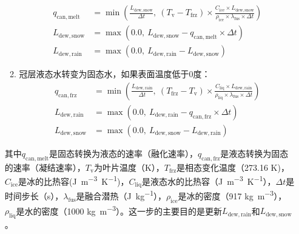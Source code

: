 \begin{enumerate}
\begin{enumerate}
\begin{equation}
\begin{aligned}
            q_{\mathrm{can, melt}} &=\min \left(\frac{L_{\mathrm{dew,snow}}}{\Delta t},\ \left(T_{\mathrm{v}}-T_{\mathrm{frz}}\right) \times \frac{C_{\mathrm{ice}} \times L_{\mathrm{dew,snow}}}{\rho_{\mathrm{i c e}} \times \lambda_{\mathrm{fus}} \times \Delta t}\right) \\
            L_{\mathrm{dew,snow}} &=\max \left(0.0,\ L_{\mathrm{dew,snow}}-q_{\mathrm{c a n, m e l t}} \times \Delta t\right) \\
            L_{\mathrm{dew,rain}} &=\max \left(0.0,\ L_{\mathrm{dew,rain}}-L_{\mathrm{dew,snow}}\right)
          \end{aligned}
        \end{equation}
      \item 冠层液态水转变为固态水，如果表面温度低于0度：
        \begin{equation}
          \begin{aligned}
            q_{\mathrm{c a n, f r z}} &=\min \left(\frac{L_{\mathrm{dew,rain}}}{\Delta t},\ \left(T_{\mathrm{f r z}}-T_{\mathrm{v}}\right) \times \frac{C_{\mathrm{liq}} \times L_{\mathrm{dew,rain}}}{\rho_{\mathrm{liq}} \times \lambda_{\mathrm{fus}} \times \Delta t}\right) \\
            L_{\mathrm{dew,rain}} &=\max \left(0.0,\ L_{\mathrm{dew,rain}}-q_{\mathrm{can, frz}} \times \Delta t\right) \\
            L_{\mathrm{dew,snow}} &=\max \left(0.0,\ L_{\mathrm{dew,snow}}-L_{\mathrm{dew,rain}}\right)
          \end{aligned}
        \end{equation}
    \end {enumerate}
  其中$q_{\mathrm{can, melt}}$是固态转换为液态的速率（融化速率），$q_{\mathrm{can, frz}}$是液态转换为固态的速率（凝结速率），$T_{\mathrm{v}}$为叶片温度（K），$T_{\mathrm{frz}}$是相态变化温度（273.16 K)，$C_{\mathrm{ice}}$是冰的比热容(\unit{J.m^{-3}.K^{-1}})，$C_{\mathrm{liq}}$是液态水的比热容（\unit{J.m^{-3}.K^{-1}}），$\Delta t$是时间步长（s），$\lambda_{\mathrm{fus}}$是融合潜热（\unit{J.kg^{-1}}），$\rho_{\mathrm{ice}}$是冰的密度（917 \unit{kg.m^{-3}}），$\rho_{\mathrm{liq}}$是水的密度（1000 \unit{kg.m^{-3}}）。这一步的主要目的是更新$L_{\mathrm{dew,rain}}$和$L_{\mathrm{dew,snow}}$。


\end{enumerate}
